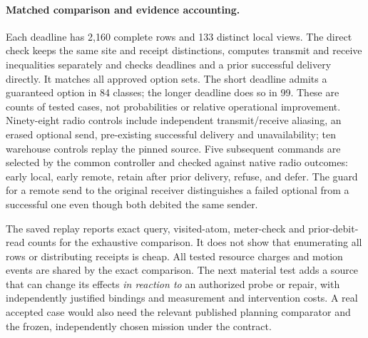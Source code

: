 \documentclass[11pt]{article}
\begin{document}
\paragraph{Matched comparison and evidence accounting.}
Each deadline has 2,160 complete rows and 133 distinct local views.
The direct check keeps the same site and receipt distinctions, computes
transmit and receive inequalities separately and checks deadlines and
a prior successful delivery directly. It matches all approved option
sets. The short deadline admits a guaranteed option in 84 classes; the
longer deadline does so in 99. These are counts of tested cases, not
probabilities or relative operational improvement. Ninety-eight radio
controls include independent transmit/receive aliasing, an erased
optional send, pre-existing successful delivery and unavailability;
ten warehouse controls replay the pinned source. Five subsequent
commands are selected by the common controller and checked against
native radio outcomes: early local, early remote, retain after prior
delivery, refuse, and defer. The guard for a remote send to the
original receiver distinguishes a failed optional from a successful
one even though both debited the same sender.

The saved replay reports exact query, visited-atom, meter-check and
prior-debit-read counts for the exhaustive comparison. It does not show
that enumerating all rows or distributing receipts is cheap. All tested resource charges and motion events are
shared by the exact comparison. The next material test adds a source
that can change its effects \emph{in reaction to} an authorized probe
or repair, with independently justified bindings and measurement and
intervention costs. A real accepted case would also need the relevant
published planning comparator and the frozen, independently chosen
mission under the contract.
\end{document}
